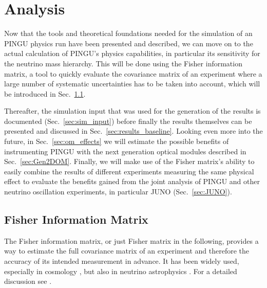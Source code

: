 \chapter{Analysis}
\label{sec:ana}

Now that the tools and theoretical foundations needed for the simulation of an
PINGU physics run have been presented and described, we can move on to the
actual calculation of PINGU's physics capabilities, in particular its
sensitivity for the neutrino mass hierarchy. This will be done using the Fisher
information matrix, a tool to quickly evaluate the covariance matrix of an
experiment where a large number of systematic uncertainties has to be taken
into account, which will be introduced in Sec.~\ref{sec:fisher}.

Thereafter, the simulation input that was used for the generation of the
results is documented (Sec.~\ref{sec:sim_input}) before finally the results
themselves can be presented and discussed in Sec.~\ref{sec:results_baseline}.
Looking even more into the future, in Sec.~\ref{sec:om_effects} we will estimate
the possible benefits of instrumenting PINGU with the next generation optical
modules described in Sec.~\ref{sec:Gen2DOM}. Finally, we will make use of the
Fisher matrix's ability to easily combine the results of different experiments
measuring the same physical effect to evaluate the benefits gained from the
joint analysis of PINGU and other neutrino oscillation experiments, in
particular JUNO \cite{JUNO} (Sec.~\ref{sec:JUNO}).


\section{Fisher Information Matrix}
\label{sec:fisher}

The Fisher information matrix, or just Fisher matrix in the following, provides
a way to estimate the full covariance matrix of an experiment and therefore the
accuracy of its intended measurement in advance. It has been widely used,
especially in cosmology \cite{Fisher_first}, but also in neutrino
astrophysics \cite{MarekDiffuse}. For a detailed discussion see \eg
\cite{Fisher_first, DETF, DETF2}.

